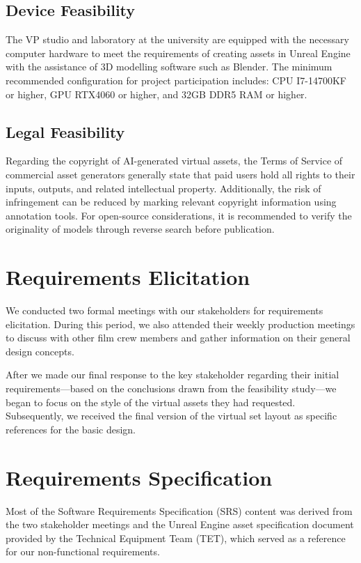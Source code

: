 \documentclass[12pt,a4paper]{report}
\begin{document}
\subsection{Device Feasibility}

The VP studio and laboratory at the university are equipped with the necessary computer hardware to meet the requirements of creating assets in Unreal Engine with the assistance of 3D modelling software such as Blender. The minimum recommended configuration for project participation includes: CPU I7-14700KF or higher, GPU RTX4060 or higher, and 32GB DDR5 RAM or higher.

\subsection{Legal Feasibility}

Regarding the copyright of AI-generated virtual assets, the Terms of Service of commercial asset generators generally state that paid users hold all rights to their inputs, outputs, and related intellectual property. Additionally, the risk of infringement can be reduced by marking relevant copyright information using annotation tools. For open-source considerations, it is recommended to verify the originality of models through reverse search before publication.

\section{Requirements Elicitation}

We conducted two formal meetings with our stakeholders for requirements elicitation. During this period, we also attended their weekly production meetings to discuss with other film crew members and gather information on their general design concepts.

After we made our final response to the key stakeholder regarding their initial requirements—based on the conclusions drawn from the feasibility study—we began to focus on the style of the virtual assets they had requested. Subsequently, we received the final version of the virtual set layout as specific references for the basic design.

\section{Requirements Specification}

Most of the Software Requirements Specification (SRS) content was derived from the two stakeholder meetings and the Unreal Engine asset specification document provided by the Technical Equipment Team (TET), which served as a reference for our non-functional requirements.
\end{document}
